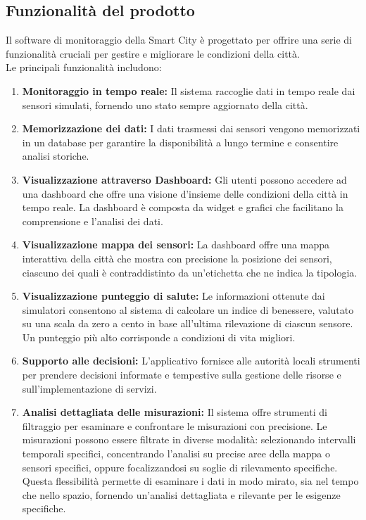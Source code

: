 \subsection{Funzionalità del prodotto}

Il software di monitoraggio della Smart City è progettato per offrire una serie di funzionalità cruciali per gestire e migliorare le condizioni della città. \\
Le principali funzionalità includono:

\begin{enumerate}
    \item \textbf{Monitoraggio in tempo reale:} Il sistema raccoglie dati in tempo reale dai sensori simulati, fornendo uno stato sempre aggiornato della città.

    \item \textbf{Memorizzazione dei dati:} I dati trasmessi dai sensori vengono memorizzati in un database per garantire la disponibilità a lungo termine e consentire analisi storiche.

    \item \textbf{Visualizzazione attraverso Dashboard:} Gli utenti possono accedere ad una dashboard che offre una visione d’insieme delle condizioni della città in tempo reale. La dashboard è composta da widget e grafici che facilitano la comprensione e l'analisi dei dati.
    
    \item \textbf{Visualizzazione mappa dei sensori:} La dashboard offre una mappa interattiva della città che mostra con precisione la posizione dei sensori, ciascuno dei quali è contraddistinto da un'etichetta che ne indica la tipologia.

    \item \textbf{Visualizzazione punteggio di salute:} Le informazioni ottenute dai simulatori consentono al sistema di calcolare un indice di benessere, valutato su una scala da zero a cento in base all'ultima rilevazione di ciascun sensore. Un punteggio più alto corrisponde a condizioni di vita migliori.

    \item \textbf{Supporto alle decisioni:} L'applicativo fornisce alle autorità locali strumenti per prendere decisioni informate e tempestive sulla gestione delle risorse e sull'implementazione di servizi.
    
    \item \textbf{Analisi dettagliata delle misurazioni:} Il sistema offre strumenti di filtraggio per esaminare e confrontare le misurazioni con precisione. Le misurazioni possono essere filtrate in diverse modalità: selezionando intervalli temporali specifici, concentrando l'analisi su precise aree della mappa o sensori specifici, oppure focalizzandosi su soglie di rilevamento specifiche. Questa flessibilità permette di esaminare i dati in modo mirato, sia nel tempo che nello spazio, fornendo un'analisi dettagliata e rilevante per le esigenze specifiche.
    

\end{enumerate}
